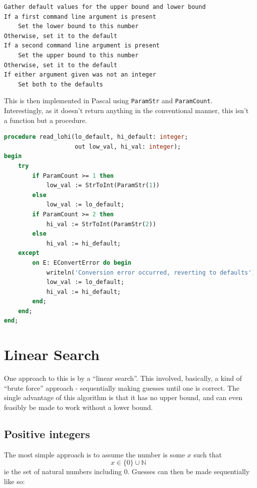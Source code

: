 \documentclass{article}
\begin{document}
\begin{lstlisting}[caption=read\_lohi pseudocode]
Gather default values for the upper bound and lower bound
If a first command line argument is present
    Set the lower bound to this number
Otherwise, set it to the default
If a second command line argument is present
    Set the upper bound to this number
Otherwise, set it to the default
If either argument given was not an integer
    Set both to the defaults
\end{lstlisting}

    This is then implemented in Pascal using \verb|ParamStr| and
    \verb|ParamCount|. Interestingly, as it doesn't return anything in the
    conventional manner, this isn't a function but a procedure.

\begin{lstlisting}[language=Pascal, caption=read\_lohi implementation]
procedure read_lohi(lo_default, hi_default: integer;
                    out low_val, hi_val: integer);
begin
    try
        if ParamCount >= 1 then
            low_val := StrToInt(ParamStr(1))
        else
            low_val := lo_default;
        if ParamCount >= 2 then
            hi_val := StrToInt(ParamStr(2))
        else
            hi_val := hi_default;
    except
        on E: EConvertError do begin
            writeln('Conversion error occurred, reverting to defaults');
            low_val := lo_default;
            hi_val := hi_default;
        end;
    end;
end;
\end{lstlisting}

    \section{Linear Search}
    One approach to this is by a ``linear search''. This involved, basically, a
    kind of ``brute force'' approach - sequentially making guesses until one is
    correct. The single advantage of this algorithm is that it has no upper
    bound, and can even feasibly be made to work without a lower bound.
    
    \subsection{Positive integers}
    The most simple approach is to assume the number is some $x$ such that
    \begin{equation}
        x \in \{0\} \cup \mathbb{N}
    \end{equation}
    ie the set of natural numbers including 0. Guesses can then be made
    sequentially like so:
\end{document}
